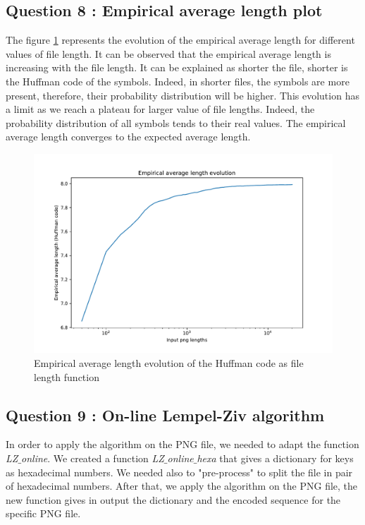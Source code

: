 \documentclass[titlepage]{article}
\begin{document}
\subsection{Question 8 : Empirical average length plot}

The figure \ref{fig:Q8} represents the evolution of the empirical average length for different values of file length. It can be observed that the empirical average length is increasing with the file length. It can be explained as shorter the file, shorter is the Huffman code of the symbols. Indeed, in shorter files, the symbols are more present, therefore, their probability distribution will be higher. This evolution has a limit as we reach a plateau for larger value of file lengths. Indeed, the probability distribution of all symbols tends to their real values. The empirical average length converges to the expected average length.  
\begin{figure}[H]
  \centering
  \includegraphics[scale=0.4]{Q8.pdf}
  \caption{Empirical average length evolution of the Huffman code as file length function }
  \label{fig:Q8}
\end{figure}

\subsection{Question 9 : On-line Lempel-Ziv algorithm}

In order to apply the algorithm on the PNG file, we needed to adapt the function \textit{LZ$\_$online}. We created a function \textit{LZ$\_$online$\_$hexa} that gives a dictionary for keys as hexadecimal numbers. We needed also to "pre-process" to split the file in pair of hexadecimal numbers. After that, we apply the algorithm on the PNG file, the new function gives in output the dictionary and the encoded sequence for the specific PNG file. \\
\end{document}
